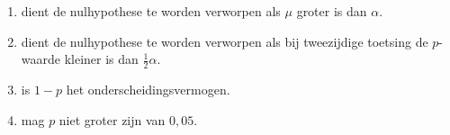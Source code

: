 \begin{enumerate}[label=(\alph*)]
    \item dient de nulhypothese te worden verworpen als $\mu$ groter is dan $\alpha$.
    \item dient de nulhypothese te worden verworpen als bij tweezijdige toetsing de $p$-waarde kleiner is dan $\frac{1}{2}\alpha$.
    \item is $1-p$ het onderscheidingsvermogen.
    \item mag $p$ niet groter zijn van $0,05$.
\end{enumerate}
